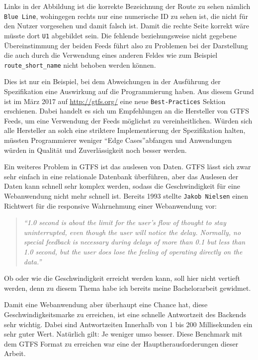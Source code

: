  Links in der Abbildung ist die korrekte Bezeichnung der Route zu sehen nämlich \texttt{Blue Line}, wohingegen rechts nur eine numerische ID zu sehen ist, die nicht für den Nutzer vorgesehen und damit falsch ist. Damit die rechte Seite korrekt wäre müsste dort \texttt{U1} abgebildet sein. Die fehlende beziehungsweise nicht gegebene Übereinstimmung der beiden Feeds führt also zu Problemen bei der Darstellung die auch durch die Verwendung eines anderen Feldes wie zum Beispiel \texttt{route\_short\_name} nicht behoben werden können. 

  Dies ist nur ein Beispiel, bei dem Abweichungen in der Ausführung der Spezifikation eine Auswirkung auf die Programmierung haben. Aus diesem Grund ist im März 2017 auf \url{http://gtfs.org/} eine neue \texttt{Best-Practices} Sektion erschienen. Dabei handelt es sich um Empfehlungen an die Hersteller von GTFS Feeds, um eine Verwendung der Feeds möglichst zu vereinheitlichen. Würden sich alle Hersteller an solch eine striktere Implementierung der Spezifikation halten, müssten Programmierer weniger "`Edge Cases"'\footnotemark abfangen und Anwendungen würden in Qualität und Zuverlässigkeit noch besser werden.\\


  Ein weiteres Problem in GTFS ist das auslesen von Daten. GTFS lässt sich zwar sehr einfach in eine relationale Datenbank überführen, aber das Auslesen der Daten kann schnell sehr komplex werden, sodass die Geschwindigkeit für eine Webanwendung nicht mehr schnell ist. Bereits 1993 stellte \texttt{Jakob Nielsen} einen Richtwert für die responsive Wahrnehmung einer Webanwendung vor:

  \begin{quote}
    \textit{"`1.0 second is about the limit for the user's flow of thought to stay uninterrupted, even though the user will notice the delay. Normally, no special feedback is necessary during delays of more than 0.1 but less than 1.0 second, but the user does lose the feeling of operating directly on the data."'}\parencite{nielsen}
  \end{quote}

  Ob oder wie die Geschwindigkeit erreicht werden kann, soll hier nicht vertieft werden, denn zu diesem Thema habe ich bereits meine Bachelorarbeit gewidmet\parencite{lorer}.

  Damit eine Webanwendung aber überhaupt eine Chance hat, diese Geschwindigkeitsmarke zu erreichen, ist eine schnelle Antwortzeit des Backends sehr wichtig. Dabei sind Antwortzeiten Innerhalb von 1 bis 200 Millisekunden ein sehr guter Wert. Natürlich gilt: Je weniger umso besser. Diese Benchmark mit dem GTFS Format zu erreichen war eine der Hauptherausforderungen dieser Arbeit.\\

